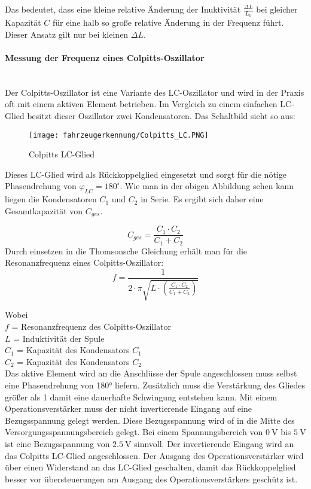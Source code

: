 Das bedeutet, dass eine kleine relative Änderung der Inuktivität $\frac{\Delta L}{L_{0}}$ bei gleicher Kapazität $C$ für eine halb so große relative Änderung in der Frequenz führt. 
Dieser Ansatz gilt nur bei kleinen $\Delta L$.

\paragraph{Messung der Frequenz eines Colpitts-Oszillator}\mbox{}\\

Der Colpitts-Oszillator ist eine Variante des LC-Oszillator und wird in der Praxis oft mit einem aktiven Element betrieben. Im Vergleich zu einem einfachen LC-Glied besitzt dieser Oszillator
zwei Kondensatoren. Das Schaltbild sieht so aus:

\begin{figure}[H]
    \centering
    \texttt{[image: fahrzeugerkennung/Colpitts\_LC.PNG]}
    \caption{Colpitts LC-Glied}
\end{figure}

Dieses LC-Glied wird als Rückkoppelglied eingesetzt und sorgt für die nötige Phasendrehung von $\varphi_{LC} = 180^{\circ}$. Wie man in der obigen Abbildung sehen kann liegen die Kondensatoren 
$C_{1}$ und $C_{2}$ in Serie. Es ergibt sich daher eine Gesamtkapazität von $C_{ges}$.

\begin{equation} \label{eq:c_gescolpitts}
    C_{ges} = \frac{C_{1} \cdot C_{2}}{C_{1} + C_{2}}
\end{equation}
Durch einsetzen in die Thomsonsche Gleichung erhält man für die Resonanzfrequenz eines Colpitts-Oszillator:
\begin{equation} \label{eq:colpitts}
    f = \frac{1}{2 \cdot \pi \sqrt{L \cdot \left( \frac{C_{1} \cdot C_{2}}{C_{1} + C_{2}} \right) }}
\end{equation}

Wobei \\
$f$ = Resonanzfrequenz des Colpitts-Oszillator\\
$L$ = Induktivität der Spule\\
$C_{1}$ = Kapazität des Kondensators $C_{1}$\\
$C_{2}$ = Kapazität des Kondensators $C_{2}$\\

\pagebreak
Das aktive Element wird an die Anschlüsse der Spule angeschlossen muss selbst eine Phasendrehung von 180° liefern. Zusätzlich muss die Verstärkung des Gliedes größer als 1 damit eine dauerhafte 
Schwingung entstehen kann. Mit einem Operationsverstärker muss der nicht invertierende Eingang auf eine Bezugsspannung gelegt werden. Diese Bezugsspannung wird of in die Mitte des Versorgungsspannungsbereich
gelegt. Bei einem Spannungsbereich von $\SI{0}{\volt}$ bis $\SI{5}{\volt}$ ist eine Bezugsspannung von $\SI{2,5}{\volt}$ sinnvoll. Der invertierende Eingang wird an das Colpitts LC-Glied angeschlossen. Der Ausgang des Operationsverstärker wird über
einen Widerstand an das LC-Glied geschalten, damit das Rückkoppelglied besser vor übersteuerungen am Ausgang des Operationsverstärkers geschütz ist. 

